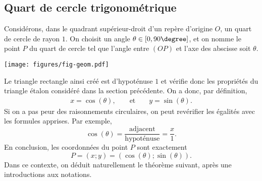 

\subsection{Quart de cercle trigonométrique}
\label{sec:quart-trigo}

Considérons, dans le quadrant supérieur-droit d'un repère d'origine $O$, un quart de cercle de rayon $1$.
On choisit un angle $\theta \in [0, 90\degree]$, et on nomme le point $P$ du quart de cercle tel que l'angle entre $(OP)$ et l'axe des abscisse soit $\theta$.

	\begin{center}
	\texttt{[image: figures/fig-geom.pdf]}
	\end{center}

Le triangle rectangle ainsi créé est d'hypoténuse $1$ et vérifie donc les propriétés du triangle étalon considéré dans la section précédente.
On a donc, par définition,
	\begin{align*}
		x = \cos(\theta), && \text{ et } && y = \sin(\theta).
	\end{align*}
Si on a pas peur des raisonnements circulaires, on peut revérifier les égalités avec les formules apprises.
Par exemple,
	\[
		\cos(\theta) = \dfrac{\text{adjacent}}{\text{hypoténuse}} = \dfrac{x}{1}.
	\]
En conclusion, les coordonnées du point $P$ sont exactement
	\[ P = (x ; y) = \left( \cos(\theta) ; \sin(\theta) \right). \]
Dans ce contexte, on déduit naturellement le théorème suivant, après une introductions aux notations.



